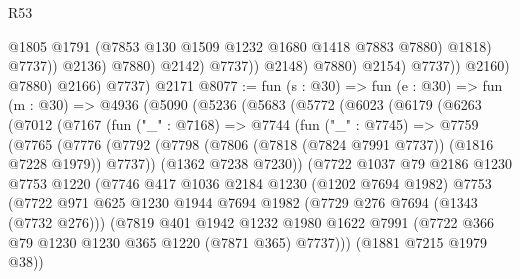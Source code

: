 \begin{lexlean}{R53}
\begin{coremodule}
                                      @1805
                                      @1791
                                      (@7853 @130 @1509 @1232 @1680 @1418 @7883 @7880)
                                      @1818)
                                    @7737))
                                @2136)
                              @7880)
                            @2142)
                          @7737))
                      @2148)
                    @7880)
                  @2154)
                @7737))
            @2160)
          @7880)
        @2166)
      @7737)
    @2171
@8077 := fun (s : @30) =>
  fun (e : @30) =>
  fun (m : @30) =>
  @4936
    (@5090
      (@5236
        (@5683
          (@5772
            (@6023
              (@6179
                (@6263
                  (@7012
                    (@7167
                      (fun ("_" : @7168) =>
                      @7744
                        (fun ("_" : @7745) =>
                        @7759
                          (@7765
                            (@7776
                              (@7792
                                (@7798
                                  (@7806 (@7818 (@7824 @7991 @7737)) (@1816 @7228 @1979))
                                  @7737))
                              (@1362 @7238 @7230))
                            (@7722
                              @1037
                              @79
                              @2186
                              @1230
                              @7753
                              @1220
                              (@7746
                                @417
                                @1036
                                @2184
                                @1230
                                (@1202 @7694 @1982)
                                @7753
                                (@7722
                                  @971
                                  @625
                                  @1230
                                  @1944
                                  @7694
                                  @1982
                                  (@7729 @276 @7694 (@1343 (@7732 @276)))
                                  (@7819
                                    @401
                                    @1942
                                    @1232
                                    @1980
                                    @1622
                                    @7991
                                    (@7722 @366 @79 @1230 @1230 @365 @1220 (@7871 @365) @7737)))
                                (@1881 @7215 @1979 @38))

\end{coremodule}
\end{lexlean}
